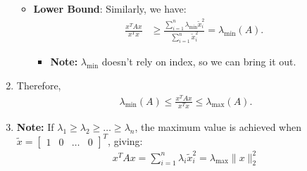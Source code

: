 \begin{derivation}
\begin{enumerate}
\begin{itemize}
            \item \textbf{Lower Bound}: Similarly, we have:
            \begin{align*}
                \frac{x^T A x}{x^T x} &\geq \frac{\sum_{i=1}^n \lambda_{\min} \tilde{x}_i^2}{\sum_{i=1}^n \tilde{x}_i^2} = \lambda_{\min}(A).
            \end{align*}
            \begin{itemize}
                \item \textbf{Note:} $\lambda_{\text{min}}$ doesn't rely on index, so we can bring it out.
            \end{itemize}
        \end{itemize}
    
        \item Therefore, 
        \begin{align*}
            \lambda_{\min}(A) \leq \frac{x^T A x}{x^T x} \leq \lambda_{\max}(A).
        \end{align*}
    
        \item \textbf{Note:} If $\lambda_1 \geq \lambda_2 \geq \dots \geq \lambda_n$, the maximum value is achieved when $\tilde{x} = \begin{bmatrix} 1 & 0 & \dots & 0 \end{bmatrix}^T$, giving:
        \begin{align*}
            x^T A x = \sum_{i=1}^{n} \lambda_i \tilde{x}_i^2 = \lambda_{\max} \|x\|_2^2
        \end{align*}
    \end{enumerate}    
\end{derivation}

